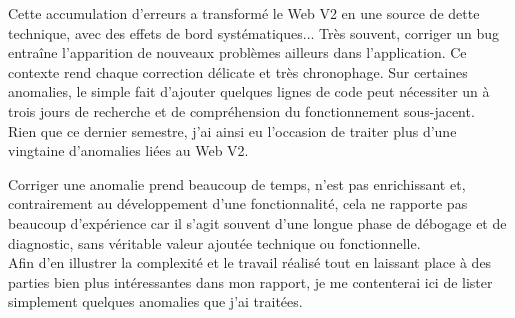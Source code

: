 \documentclass{article}
\begin{document}
Cette accumulation d'erreurs a transformé le Web V2 en une source de dette technique, avec des effets de bord systématiques... Très souvent, corriger un bug entraîne l'apparition de nouveaux problèmes ailleurs dans l'application. Ce contexte rend chaque correction délicate et très chronophage. Sur certaines anomalies, le simple fait d'ajouter quelques lignes de code peut nécessiter un à trois jours de recherche et de compréhension du fonctionnement sous-jacent. \\

Rien que ce dernier semestre, j'ai ainsi eu l'occasion de traiter plus d'une vingtaine d'anomalies liées au Web V2. 

Corriger une anomalie prend beaucoup de temps, n'est pas enrichissant et, contrairement au développement d'une fonctionnalité, cela ne rapporte pas beaucoup d'expérience car il s'agit souvent d'une longue phase de débogage et de diagnostic, sans véritable valeur ajoutée technique ou fonctionnelle. \\

Afin d'en illustrer la complexité et le travail réalisé tout en laissant place à des parties bien plus intéressantes dans mon rapport, je me contenterai ici de lister simplement quelques anomalies que j'ai traitées.
\end{document}
